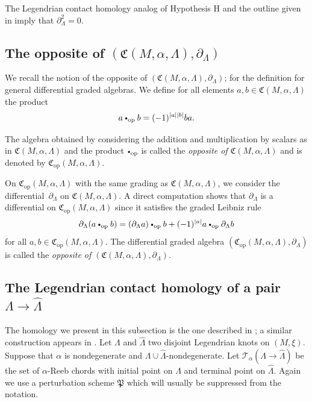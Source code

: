 \documentclass[10pt]{amsart}
\let\mathcal\mathscr
\let\ra\rightarrow
\newcommand{\opp}{\mathrm{op}}
\newcommand{\cbullet}{{\raisebox{1pt}{$\scriptscriptstyle\bullet$}}}
\newcommand*{\bigcdotop}{\mathbin{\cbullet_{\opp}}}
\theoremstyle{plain}
\theoremstyle{definition}
\numberwithin{equation}{subsection}
\begin{document}
The Legendrian contact homology analog of Hypothesis H and the outline given in \cite[\S 2.8]{SFT} imply that $\partial_{\Lambda}^2=0$.

\subsection{The opposite of $(\mathfrak{C}(M,\alpha,\Lambda),\partial_{\Lambda})$}

We recall the notion of the opposite of $(\mathfrak{C}(M,\alpha,\Lambda),\partial_{\Lambda})$; \cf \cite{Halp,St} for the definition for general differential graded algebras.
We define for all elements $a,b \in \mathfrak{C}(M,\alpha,\Lambda)$ the product
\begin{equation}
a \bigcdotop b = (-1)^{|a||b|}ba.
\end{equation}

The algebra obtained by considering the addition and multiplication by scalars as in $\mathfrak{C}(M,\alpha,\Lambda)$ and the product $\bigcdotop$ is called the {\em opposite of $\mathfrak{C}(M,\alpha,\Lambda)$} and is denoted by $\mathfrak{C}_{\opp}(M,\alpha,\Lambda)$.

On $\mathfrak{C}_{\opp}(M,\alpha,\Lambda)$ with the same grading as $\mathfrak{C}(M,\alpha,\Lambda)$, we consider the differential~$\partial_\Lambda$ on $\mathfrak{C}(M,\alpha,\Lambda)$. A direct computation shows that $\partial_\Lambda$ is a differential on $\mathfrak{C}_{\opp}(M,\alpha,\Lambda)$ since it satisfies the graded Leibniz rule
\begin{equation}
\partial_\Lambda(a \bigcdotop b)= (\partial_\Lambda a) \bigcdotop b + (-1)^{|a|}a \bigcdotop \partial_\Lambda b
\end{equation}
for all $a, b \in \mathfrak{C}_{\opp}(M,\alpha,\Lambda)$. The differential graded algebra $(\mathfrak{C}_{\opp}(M,\alpha,\Lambda),\partial_\Lambda)$ is called the {\em opposite of $(\mathfrak{C}(M,\alpha,\Lambda),\partial_{\Lambda})$.}

\subsection{The Legendrian contact homology of a pair $\Lambda\ra\widehat{\Lambda}$}

The homology we present in this subsection is the one described in \cite[Rem.\,7.4]{BEE}; a similar construction appears in \cite{Ek}.
Let $\Lambda$ and $\widehat{\Lambda}$ two disjoint Legendrian knots on $(M,\xi)$. Suppose that $\alpha$ is nondegenerate and $\Lambda\cup\widehat{\Lambda}$-nondegenerate. Let $\mathcal{T}_\alpha(\Lambda\ra\widehat{\Lambda})$ be the set of $\alpha$-Reeb chords with initial point on $\Lambda$ and terminal point on $\widehat{\Lambda}$. Again we use a perturbation scheme ${\mathfrak P}$ which will usually be suppressed from the notation.
\end{document}
